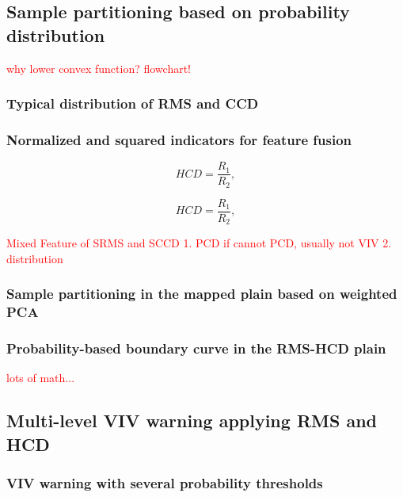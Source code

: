 \documentclass[preprint, 3p, times, compress, 11pt]{elsarticle}
\begin{document}
\subsection{Sample partitioning based on probability distribution}
\label{sec:partition}

\textcolor{red}{
    why lower convex function?
    flowchart!
}

\subsubsection{Typical distribution of RMS and CCD}

\subsubsection{Normalized and squared indicators for feature fusion}





\begin{equation}
    HCD = \frac{R_1}{R_2},
    \label{eq:mixed_feature}
\end{equation}

\begin{equation}
    HCD = \frac{R_1}{R_2},
    \label{eq:w_PCA}
\end{equation}








\textcolor{red}{
    Mixed Feature of SRMS and SCCD
    1. PCD
    if cannot PCD, usually not VIV 
    2. distribution
}

\subsubsection{Sample partitioning in the mapped plain based on weighted PCA}

\subsubsection{Probability-based boundary curve in the RMS-HCD plain}

\textcolor{red}{
    lots of math...
}

\subsection{Multi-level VIV warning applying RMS and HCD}

\subsubsection{VIV warning with several probability thresholds}
\end{document}
